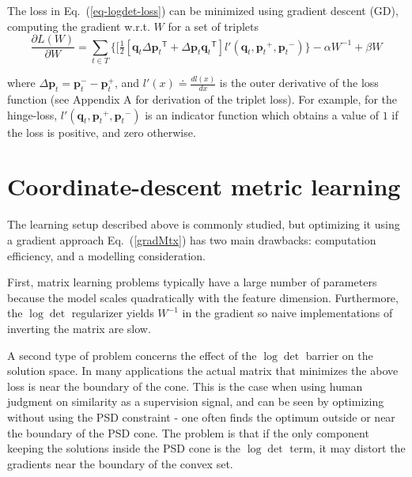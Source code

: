 \documentclass{article} %
\newcommand\mat[1]{{#1}}
\renewcommand\vec[1]{\mathbf{#1}}
\newcommand{\T}{{}^\mathsf{T}}
\newcommand{\W}{\mat{W}}
\newcommand{\eqdef}{\doteq}
\newcommand{\q}{{\vec{q}}}
\newcommand{\p}{{\vec{p}}}
\newcommand{\trip}{{t}}
\newcommand{\qt}{{\q_{\trip}}}
\newcommand{\pt}{{\p_{\trip}}}
\newcommand{\triplet}{(\qt, \pt^{+}, \pt^{-})}
\renewcommand{\eqref}[1]{Eq.~(\ref{#1})}
\begin{document}
The loss in \eqref{eq-logdet-loss} can be minimized using gradient descent (GD), computing the gradient w.r.t. $\W$ for a set of triplets
\begin{equation}
  \frac{\partial {L (\W)}}{\partial \W} = \sum\limits_{t\in T}{\{
  [\tfrac{1}{2}[\q_{t}\Delta\p_{t}\T + \Delta\p_{t}\q_{t}\T]  }
  {l'}\triplet\} - \alpha \W^{-1} + \beta \W
  \label{gradMtx}
\end{equation}

where $\Delta\p_t = \p_t^- - \p_t^+$, and $l'(x) \eqdef \frac{d{l(x)}}{dx}$ is the outer derivative of the loss function (see Appendix A for derivation of the triplet loss). For example, for the hinge-loss, 
$l'\triplet$ 
is an indicator function which obtains a value of $1$ if the loss is positive, and zero otherwise.


\section{Coordinate-descent metric learning}

The learning setup described above is commonly studied, but 
optimizing it using a gradient approach \eqref{gradMtx} has two main drawbacks: computation efficiency, and a modelling consideration.

First, matrix learning problems typically have a large number of parameters because the model scales quadratically with the feature dimension. %
Furthermore, the $\log \det$ regularizer yields $\W^{-1}$ in the gradient so naive implementations of inverting the matrix are slow.

A second type of problem concerns the effect of the $\log \det$ barrier on the solution space. In many applications the actual matrix that minimizes the above loss is near the boundary of the cone. This is the case when using human judgment on similarity as a supervision signal, and can be seen by optimizing without using the PSD constraint - one often finds the optimum outside or near the boundary of the PSD cone.
The problem is that if the only component keeping the solutions inside the PSD cone is the $\log \det$ term, it may distort the gradients near the boundary of the convex set. 
\end{document}
